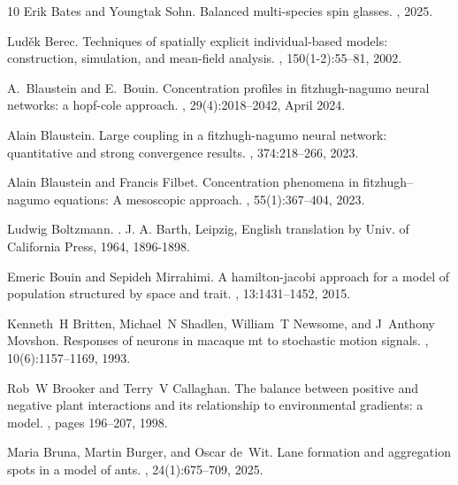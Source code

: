 \documentclass[onefignum,onetabnum]{siamart190516}
\newcommand{\1}{\mathbbm{1}}
\begin{document}
\begin{thebibliography}{10}
Erik Bates and Youngtak Sohn.
\newblock Balanced multi-species spin glasses.
, 2025.

Lud{\v{e}}k Berec.
\newblock Techniques of spatially explicit individual-based models:
  construction, simulation, and mean-field analysis.
, 150(1-2):55--81, 2002.

A.~Blaustein and E.~Bouin.
\newblock Concentration profiles in fitzhugh-nagumo neural networks: a
  hopf-cole approach.
,
  29(4):2018--2042, April 2024.

Alain Blaustein.
\newblock Large coupling in a fitzhugh-nagumo neural network: quantitative and
  strong convergence results.
, 374:218--266, 2023.

Alain Blaustein and Francis Filbet.
\newblock Concentration phenomena in fitzhugh--nagumo equations: A mesoscopic
  approach.
, 55(1):367--404, 2023.

Ludwig Boltzmann.
.
\newblock J. A. Barth, Leipzig, English translation by Univ. of California
  Press, 1964, 1896-1898.

Emeric Bouin and Sepideh Mirrahimi.
\newblock A hamilton-jacobi approach for a model of population structured by
  space and trait.
, 13:1431--1452, 2015.

Kenneth~H Britten, Michael~N Shadlen, William~T Newsome, and J~Anthony Movshon.
\newblock Responses of neurons in macaque mt to stochastic motion signals.
, 10(6):1157--1169, 1993.

Rob~W Brooker and Terry~V Callaghan.
\newblock The balance between positive and negative plant interactions and its
  relationship to environmental gradients: a model.
, pages 196--207, 1998.

Maria Bruna, Martin Burger, and Oscar de~Wit.
\newblock Lane formation and aggregation spots in a model of ants.
, 24(1):675--709,
  2025.


\end{thebibliography}
\end{document}
